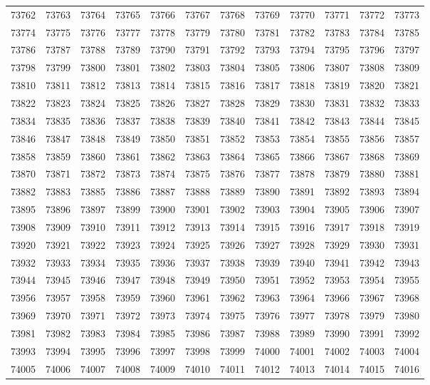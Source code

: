 \begin{center}
\begin{longtable}{llllllllllll}
73762 &73763 &73764 &73765 &73766 &73767 &73768 &73769 &73770 &73771 &73772 &73773 \\
73774 &73775 &73776 &73777 &73778 &73779 &73780 &73781 &73782 &73783 &73784 &73785 \\
73786 &73787 &73788 &73789 &73790 &73791 &73792 &73793 &73794 &73795 &73796 &73797 \\
73798 &73799 &73800 &73801 &73802 &73803 &73804 &73805 &73806 &73807 &73808 &73809 \\
73810 &73811 &73812 &73813 &73814 &73815 &73816 &73817 &73818 &73819 &73820 &73821 \\
73822 &73823 &73824 &73825 &73826 &73827 &73828 &73829 &73830 &73831 &73832 &73833 \\
73834 &73835 &73836 &73837 &73838 &73839 &73840 &73841 &73842 &73843 &73844 &73845 \\
73846 &73847 &73848 &73849 &73850 &73851 &73852 &73853 &73854 &73855 &73856 &73857 \\
73858 &73859 &73860 &73861 &73862 &73863 &73864 &73865 &73866 &73867 &73868 &73869 \\
73870 &73871 &73872 &73873 &73874 &73875 &73876 &73877 &73878 &73879 &73880 &73881 \\
73882 &73883 &73885 &73886 &73887 &73888 &73889 &73890 &73891 &73892 &73893 &73894 \\
73895 &73896 &73897 &73899 &73900 &73901 &73902 &73903 &73904 &73905 &73906 &73907 \\
73908 &73909 &73910 &73911 &73912 &73913 &73914 &73915 &73916 &73917 &73918 &73919 \\
73920 &73921 &73922 &73923 &73924 &73925 &73926 &73927 &73928 &73929 &73930 &73931 \\
73932 &73933 &73934 &73935 &73936 &73937 &73938 &73939 &73940 &73941 &73942 &73943 \\
73944 &73945 &73946 &73947 &73948 &73949 &73950 &73951 &73952 &73953 &73954 &73955 \\
73956 &73957 &73958 &73959 &73960 &73961 &73962 &73963 &73964 &73966 &73967 &73968 \\
73969 &73970 &73971 &73972 &73973 &73974 &73975 &73976 &73977 &73978 &73979 &73980 \\
73981 &73982 &73983 &73984 &73985 &73986 &73987 &73988 &73989 &73990 &73991 &73992 \\
73993 &73994 &73995 &73996 &73997 &73998 &73999 &74000 &74001 &74002 &74003 &74004 \\
74005 &74006 &74007 &74008 &74009 &74010 &74011 &74012 &74013 &74014 &74015 &74016 \\

\end{longtable}
\end{center}
